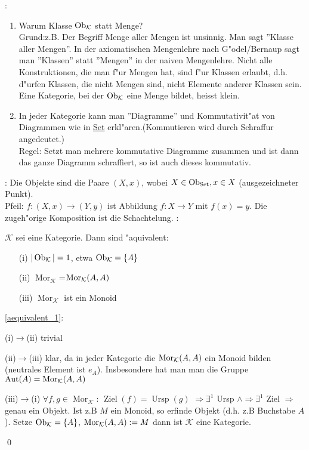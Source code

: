 :{\begin{enumerate}
\item Warum Klasse $\operatorname{Ob}_{\mathcal{K}}$ statt Menge? \\
Grund:z.B. Der Begriff Menge aller Mengen ist unsinnig. Man sagt ''Klasse
aller Mengen''. In der axiomatischen Mengenlehre nach G"odel/Bernaup sagt man
''Klassen'' statt ''Mengen'' in der naiven Mengenlehre. Nicht alle Konstruktionen,
die man f"ur Mengen hat, sind f"ur Klassen erlaubt, d.h. d"urfen Klassen, die nicht
Mengen sind, nicht Elemente anderer Klassen sein. Eine Kategorie, bei der $\operatorname{Ob}_{\mathcal{K}}$
eine Menge bildet, heisst klein.
\item In jeder Kategorie kann man ''Diagramme'' und Kommutativit"at von Diagrammen
wie in \underline{Set} erkl"aren.(Kommutieren wird durch Schraffur angedeutet.)\\
Regel: Setzt man mehrere kommutative Diagramme zusammen und ist dann das ganze
Diagramm schraffiert, so ist auch dieses kommutativ.
\end{enumerate}}                                    
:{
Die Objekte sind die Paare $(X,x)$, wobei $ X\in \operatorname{Ob}_{\mathcal{\operatorname{Set}}}, x\in X$ (ausgezeichneter Punkt).\\
Pfeil: $f:(X,x)\longrightarrow (Y,y)$
ist Abbildung $f:X\longrightarrow Y$ mit $f(x)=y$. Die zugeh"orige Komposition 
ist die Schachtelung.}
\remark{}:{$\mathcal{K}$ \label{aequivalent_1}
sei eine Kategorie. Dann sind "aquivalent:
\begin{enumerate}
\item[(i)] $|\operatorname{Ob}_{\mathcal{K}}|=1$, etwa $\operatorname{Ob}_{\mathcal{K}}=\{A\}$
\item[(ii)] $\operatorname{Mor}_{\mathcal{K}}$=$\Mor(K;A;A)$
\item[(iii)]$\operatorname{Mor}_{\mathcal{K}}$ ist ein Monoid
\end{enumerate}}                          		
\proof \ref{aequivalent_1}:{
  \begin{description}
    \item{(i)$\longrightarrow$(ii)}  trivial
    \item{(ii)$\longrightarrow$(iii)}
	  klar, da in jeder Kategorie die $\Mor(K;A;A)$
      ein Monoid bilden (neutrales Element ist $e_A$). Insbesondere hat man
      man die Gruppe   $\operatorname{Aut}(A)=\Mor(K;A;A)$  
    \item{(iii)$\longrightarrow$(i)}  $\forall f,g\in \operatorname{Mor}_{\mathcal{K}}$:
    $\operatorname{Ziel}(f)=\operatorname{Ursp}(g)$
    $\Rightarrow \exists^{1}$  Ursp $\land \Rightarrow \exists^{1}$ Ziel
    $\Rightarrow$ genau ein Objekt. Ist z.B $M$ ein Monoid, so erfinde
    Objekt (d.h. z.B Buchstabe $A$). Setze $\operatorname{Ob}_{\mathcal{K}}=\{A\}$,
    $\Mor(K;A;A):=M$ dann ist $\mathcal{K}$ eine Kategorie.
    \end{description}
\qed	
}
